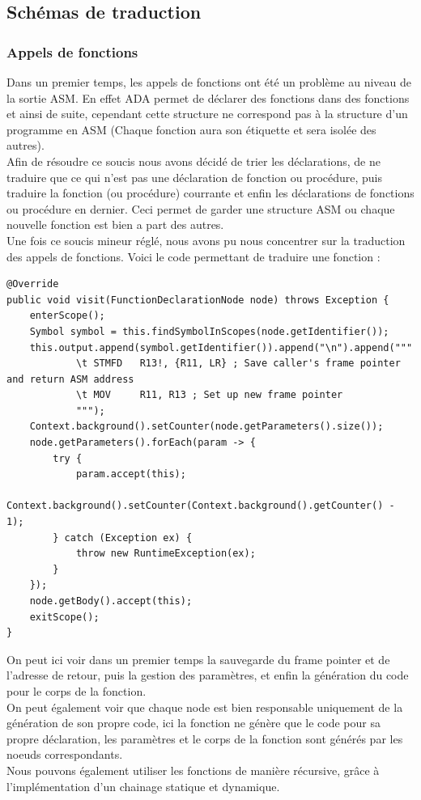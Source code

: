 \documentclass[french,a4paper]{article}
\begin{document}
    \subsection{Schémas de traduction}
    \subsubsection{Appels de fonctions}

    Dans un premier temps, les appels de fonctions ont été un problème au niveau de la sortie ASM. En effet ADA permet de déclarer des fonctions dans des fonctions et ainsi de suite, cependant cette structure ne correspond pas à la structure d'un programme en ASM (Chaque fonction aura son étiquette et sera isolée des autres). \\
    Afin de résoudre ce soucis nous avons décidé de trier les déclarations, de ne traduire que ce qui n'est pas une déclaration de fonction ou procédure, puis traduire la fonction (ou procédure) courrante et enfin les déclarations de fonctions ou procédure en dernier. Ceci permet de garder une structure ASM ou chaque nouvelle fonction est bien a part des autres. \\

    Une fois ce soucis mineur réglé, nous avons pu nous concentrer sur la traduction des appels de fonctions.
    Voici le code permettant de traduire une fonction :
    \begin{lstlisting}
@Override
public void visit(FunctionDeclarationNode node) throws Exception {
    enterScope();
    Symbol symbol = this.findSymbolInScopes(node.getIdentifier());
    this.output.append(symbol.getIdentifier()).append("\n").append("""
            \t STMFD   R13!, {R11, LR} ; Save caller's frame pointer and return ASM address
            \t MOV     R11, R13 ; Set up new frame pointer
            """);
    Context.background().setCounter(node.getParameters().size());
    node.getParameters().forEach(param -> {
        try {
            param.accept(this);
            Context.background().setCounter(Context.background().getCounter() - 1);
        } catch (Exception ex) {
            throw new RuntimeException(ex);
        }
    });
    node.getBody().accept(this);
    exitScope();
}
    \end{lstlisting}

    On peut ici voir dans un premier temps la sauvegarde du frame pointer et de l'adresse de retour, puis la gestion des paramètres, et enfin la génération du code pour le corps de la fonction. \\
    On peut également voir que chaque node est bien responsable uniquement de la génération de son propre code, ici la fonction ne génère que le code pour sa propre déclaration, les paramètres et le corps de la fonction sont générés par les noeuds correspondants. \\
    Nous pouvons également utiliser les fonctions de manière récursive, grâce à l'implémentation d'un chainage statique et dynamique. \\
\end{document}
